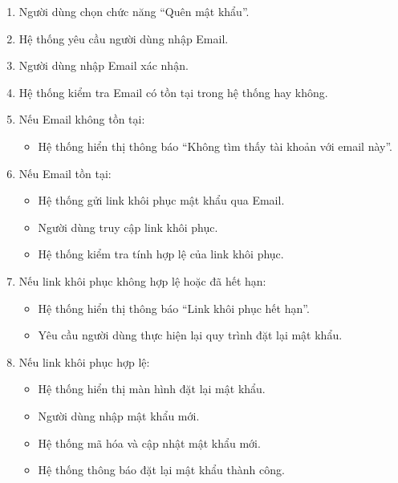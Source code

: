 \begin{enumerate}
    \item Người dùng chọn chức năng ``Quên mật khẩu''.
    
    \item Hệ thống yêu cầu người dùng nhập Email.
    
    \item Người dùng nhập Email xác nhận.
    
    \item Hệ thống kiểm tra Email có tồn tại trong hệ thống hay không.

    \item Nếu Email không tồn tại:
    \begin{itemize}
        \item Hệ thống hiển thị thông báo ``Không tìm thấy tài khoản với email này''.
    \end{itemize}

    \item Nếu Email tồn tại:
    \begin{itemize}
        \item Hệ thống gửi link khôi phục mật khẩu qua Email.
        
        \item Người dùng truy cập link khôi phục.
        
        \item Hệ thống kiểm tra tính hợp lệ của link khôi phục.
    \end{itemize}

    \item Nếu link khôi phục không hợp lệ hoặc đã hết hạn:
    \begin{itemize}
        \item Hệ thống hiển thị thông báo ``Link khôi phục hết hạn''.
        
        \item Yêu cầu người dùng thực hiện lại quy trình đặt lại mật khẩu.
    \end{itemize}

    \item Nếu link khôi phục hợp lệ:
    \begin{itemize}
        \item Hệ thống hiển thị màn hình đặt lại mật khẩu.
        
        \item Người dùng nhập mật khẩu mới.
        
        \item Hệ thống mã hóa và cập nhật mật khẩu mới.
        
        \item Hệ thống thông báo đặt lại mật khẩu thành công.
    \end{itemize}
\end{enumerate}

